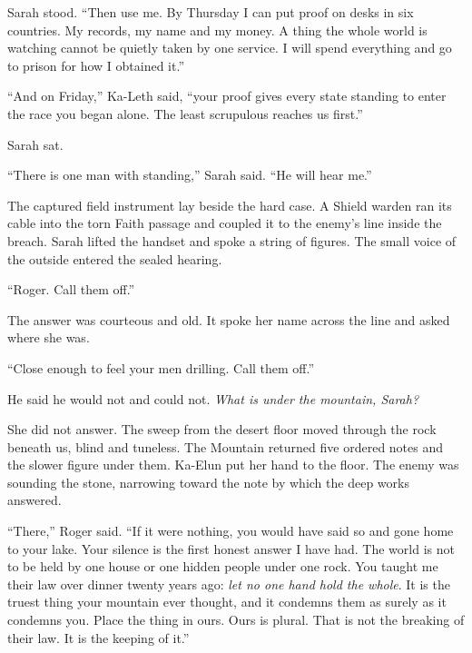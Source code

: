 Sarah stood. ``Then use me. By Thursday I can put proof on desks in six countries. My records, my name and my money. A thing the whole world is watching cannot be quietly taken by one service. I will spend everything and go to prison for how I obtained it.''\par

``And on Friday,'' Ka-Leth said, ``your proof gives every state standing to enter the race you began alone. The least scrupulous reaches us first.''\par

Sarah sat.\par

``There is one man with standing,'' Sarah said. ``He will hear me.''\par

The captured field instrument lay beside the hard case. A Shield warden ran its cable into the torn Faith passage and coupled it to the enemy's line inside the breach. Sarah lifted the handset and spoke a string of figures. The small voice of the outside entered the sealed hearing.\par

``Roger. Call them off.''\par

The answer was courteous and old. It spoke her name across the line and asked where she was.\par

``Close enough to feel your men drilling. Call them off.''\par

He said he would not and could not. \emph{What is under the mountain, Sarah?}\par

She did not answer. The sweep from the desert floor moved through the rock beneath us, blind and tuneless. The Mountain returned five ordered notes and the slower figure under them. Ka-Elun put her hand to the floor. The enemy was sounding the stone, narrowing toward the note by which the deep works answered.\par

``There,'' Roger said. ``If it were nothing, you would have said so and gone home to your lake. Your silence is the first honest answer I have had. The world is not to be held by one house or one hidden people under one rock. You taught me their law over dinner twenty years ago: \emph{let no one hand hold the whole}. It is the truest thing your mountain ever thought, and it condemns them as surely as it condemns you. Place the thing in ours. Ours is plural. That is not the breaking of their law. It is the keeping of it.''\par

